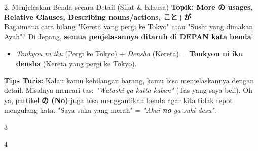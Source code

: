 \begin{lessonbox}{2. Menjelaskan Benda secara Detail (Sifat \& Klausa)}
    \textbf{Topik: More の usages, Relative Clauses, Describing nouns/actions, こと+が} \\
    Bagaimana cara bilang "Kereta yang pergi ke Tokyo" atau "Sushi yang dimakan Ayah"? Di Jepang, \textbf{semua penjelasannya ditaruh di DEPAN kata benda}! 
    \begin{itemize}
        \item \textit{Toukyou ni iku} (Pergi ke Tokyo) + \textit{Densha} (Kereta) = \textbf{Toukyou ni iku densha} (Kereta yang pergi ke Tokyo).
    \end{itemize}
    \textbf{Tips Turis:} Kalau kamu kehilangan barang, kamu bisa menjelaskannya dengan detail. Misalnya mencari tas: \textit{"Watashi ga katta kaban"} (Tas yang saya beli). Oh ya, partikel \textbf{の (No)} juga bisa menggantikan benda agar kita tidak repot mengulang kata. "Saya suka yang merah" = \textit{"Akai \textbf{no} ga suki desu"}.
\end{lessonbox}

\begin{convobox}{3}
    \noindent
      
      
     

    \vspace{1.5em}
\end{convobox}

\begin{convobox}{4}
    \noindent
       

    \vspace{1.5em}
\end{convobox}


